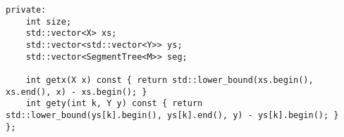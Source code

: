 \begin{lstlisting}
private:
    int size;
    std::vector<X> xs;
    std::vector<std::vector<Y>> ys;
    std::vector<SegmentTree<M>> seg;

    int getx(X x) const { return std::lower_bound(xs.begin(), xs.end(), x) - xs.begin(); }
    int gety(int k, Y y) const { return std::lower_bound(ys[k].begin(), ys[k].end(), y) - ys[k].begin(); }
};
\end{lstlisting}